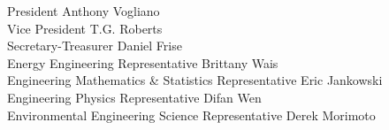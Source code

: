 President \hfill Anthony Vogliano \\
Vice President \hfill T.G. Roberts\\
Secretary-Treasurer \hfill Daniel Frise \\
Energy Engineering Representative \hfill Brittany Wais \\
Engineering Mathematics \& Statistics Representative \hfill Eric Jankowski \\
Engineering Physics Representative \hfill Difan Wen \\
Environmental Engineering Science Representative \hfill Derek Morimoto

